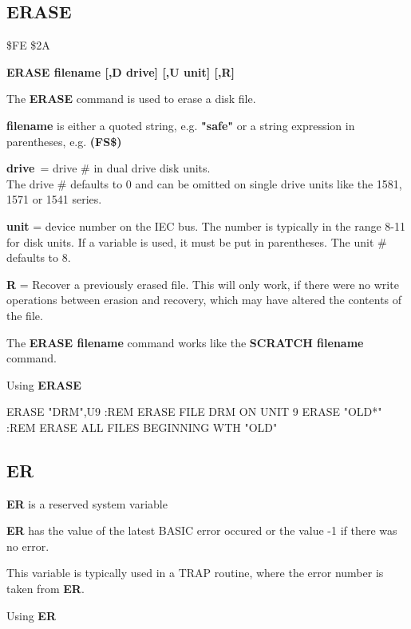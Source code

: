 
\newpage
\subsection{ERASE}
\begin{description}[leftmargin=3cm,style=nextline]
\item [Token:] \$FE \$2A
\item [Format:] {\bf ERASE filename [,D drive] [,U unit] [,R]}
\item [Usage:] The {\bf ERASE} command is used
               to erase a disk file.

   {\bf filename} is either a quoted string, e.g. {\bf "safe"} or
   a string expression in parentheses, e.g. {\bf (FS\$)}

   {\bf drive} = drive \# in dual drive disk units. \\
   The drive \# defaults to 0 and can be omitted on single drive units
   like the 1581, 1571 or 1541 series.

   {\bf unit} = device number on the IEC bus.
   The number is typically in the range 8-11 for disk units.
   If a variable is used, it must be put in parentheses.
   The unit \# defaults to 8.

   {\bf R} = Recover a previously erased file.
   This will only work, if there were no write operations
   between erasion and recovery, which may have altered the
   contents of the file.

\item [Remarks:] The {\bf ERASE filename} command works like the
                 {\bf SCRATCH filename} command.

\item [Example:] Using {\bf ERASE}
\begin{screenoutput}
  ERASE "DRM",U9 :REM ERASE FILE DRM ON UNIT 9
  ERASE "OLD*"   :REM ERASE ALL FILES BEGINNING WTH "OLD"
\end{screenoutput}
\end{description}


\newpage
\subsection{ER}
\begin{description}[leftmargin=3cm,style=nextline]
\item [Format:] {\bf ER} is a reserved system variable
\item [Usage:]  {\bf ER} has the value of the latest BASIC error
               occured or the value -1 if there was no error.

This variable is typically used in a TRAP routine,
where the error number is taken from {\bf ER}.

\item [Example:] Using {\bf ER}
\end{description}

